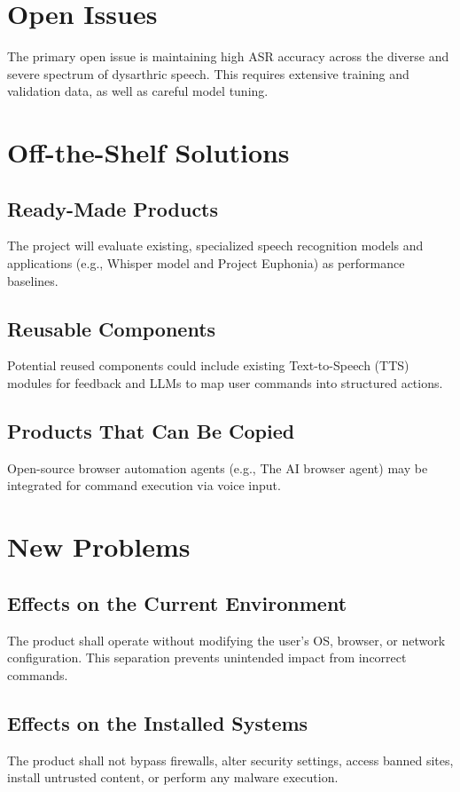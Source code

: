 \documentclass[12pt]{article}
\begin{document}
\section{Open Issues}
The primary open issue is maintaining high ASR accuracy across the diverse and severe spectrum of dysarthric speech. This requires extensive training and validation data, as well as careful model tuning.


\section{Off-the-Shelf Solutions}
\subsection{Ready-Made Products}
The project will evaluate existing, specialized speech recognition models and applications (e.g., Whisper model and Project Euphonia) as performance baselines.

\subsection{Reusable Components}
Potential reused components could include existing Text-to-Speech (TTS) modules for feedback and LLMs to map user commands into structured actions.

\subsection{Products That Can Be Copied}
Open-source browser automation agents (e.g., The AI browser agent) may be integrated for command execution via voice input.


\section{New Problems}
\subsection{Effects on the Current Environment}
The product shall operate without modifying the user’s OS, browser, or network configuration. This separation prevents unintended impact from incorrect commands.

\subsection{Effects on the Installed Systems}
The product shall not bypass firewalls, alter security settings, access banned sites, install untrusted content, or perform any malware execution.
\end{document}
